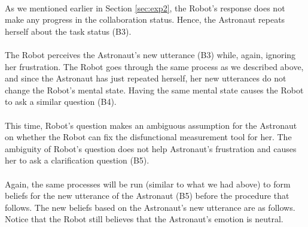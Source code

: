 \noindent{}\\

As we mentioned earlier in Section \ref{sec:exp2}, the Robot's response does not
make any progress in the collaboration status. Hence, the Astronaut repeats
herself about the task status (B3).\\

\noindent{}\\

The Robot perceives the Astronaut's new utterance (B3) while, again, ignoring
her frustration. The Robot goes through the same process as we described above,
and since the Astronaut has just repeated herself, her new utterances do not
change the Robot's mental state. Having the same mental state causes the Robot
to ask a similar question (B4).\\

\noindent{}\\

This time, Robot's question makes an ambiguous assumption for the Astronaut on
whether the Robot can fix the disfunctional measurement tool for her. The
ambiguity of Robot's question does not help Astronaut's frustration and causes
her to ask a clarification question (B5).\\

\noindent{}\\

Again, the same processes will be run (similar to what we had above) to form
beliefs for the new utterance of the Astronaut (B5) before the procedure that
follows. The new beliefs based on the Astronaut's new utterance are as follows.
Notice that the Robot still believes that the Astronaut's emotion is neutral.

